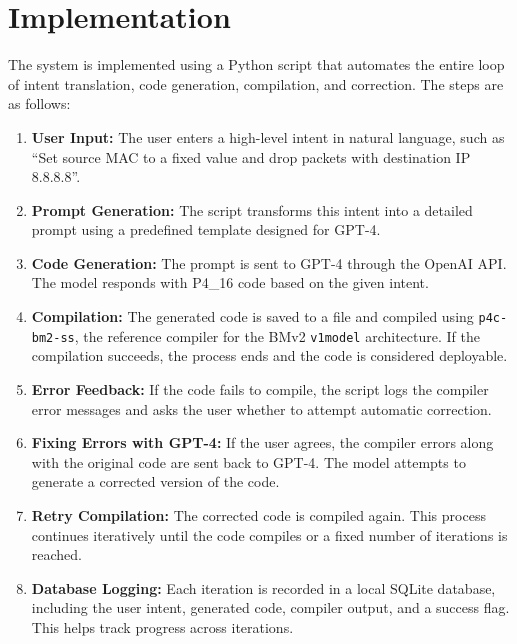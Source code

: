 \documentclass[sigconf]{acmart}
\begin{document}
\section{Implementation}

The system is implemented using a Python script that automates the entire loop of intent translation, code generation, compilation, and correction. The steps are as follows:

\begin{enumerate}
    \item \textbf{User Input:} The user enters a high-level intent in natural language, such as ``Set source MAC to a fixed value and drop packets with destination IP 8.8.8.8''.
    
    \item \textbf{Prompt Generation:} The script transforms this intent into a detailed prompt using a predefined template designed for GPT-4.
    
    \item \textbf{Code Generation:} The prompt is sent to GPT-4 through the OpenAI API. The model responds with P4\_16 code based on the given intent.
    
    \item \textbf{Compilation:} The generated code is saved to a file and compiled using \texttt{p4c-bm2-ss}, the reference compiler for the BMv2 \texttt{v1model} architecture. If the compilation succeeds, the process ends and the code is considered deployable.
    
    \item \textbf{Error Feedback:} If the code fails to compile, the script logs the compiler error messages and asks the user whether to attempt automatic correction.
    
    \item \textbf{Fixing Errors with GPT-4:} If the user agrees, the compiler errors along with the original code are sent back to GPT-4. The model attempts to generate a corrected version of the code.
    
    \item \textbf{Retry Compilation:} The corrected code is compiled again. This process continues iteratively until the code compiles or a fixed number of iterations is reached.
    
    \item \textbf{Database Logging:} Each iteration is recorded in a local SQLite database, including the user intent, generated code, compiler output, and a success flag. This helps track progress across iterations.
\end{enumerate}
\end{document}
